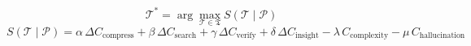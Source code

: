 \begin{equation}
\mathcal{T}^{*} = \arg\max_{\mathcal{T} \in \mathfrak{T}} S(\mathcal{T} \mid \mathcal{P})
\end{equation}
\begin{equation}
S(\mathcal{T} \mid \mathcal{P}) =
\alpha\,\Delta C_{\text{compress}}
+ \beta\,\Delta C_{\text{search}}
+ \gamma\,\Delta C_{\text{verify}}
+ \delta\,\Delta C_{\text{insight}}
- \lambda\,C_{\text{complexity}}
- \mu\,C_{\text{hallucination}}
\end{equation}

